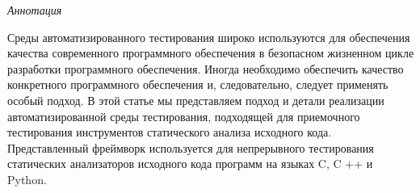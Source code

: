 \textit{Аннотация}

Среды автоматизированного тестирования широко используются для обеспечения качества современного программного обеспечения в безопасном жизненном цикле разработки программного обеспечения. Иногда необходимо обеспечить качество конкретного программного обеспечения и, следовательно, следует применять особый подход. В этой статье мы представляем подход и детали реализации автоматизированной среды тестирования, подходящей для приемочного тестирования инструментов статического анализа исходного кода. Представленный фреймворк используется для непрерывного тестирования статических анализаторов исходного кода программ на языках C, C ++ и Python.
